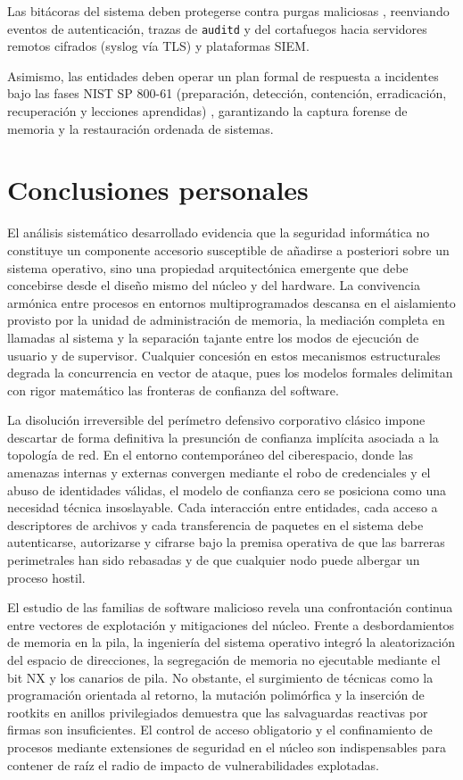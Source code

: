 \documentclass[12pt]{article}
\begin{document}
Las bitácoras del sistema deben protegerse contra purgas maliciosas \parencite[\S 15.1, p.\ 660]{stallings2018operating}, reenviando eventos de autenticación, trazas de \texttt{auditd} y del cortafuegos hacia servidores remotos cifrados (syslog vía TLS) y plataformas SIEM.

Asimismo, las entidades deben operar un plan formal de respuesta a incidentes bajo las fases NIST SP 800-61 (preparación, detección, contención, erradicación, recuperación y lecciones aprendidas) \parencite[\S 3, pp.\ 21--43]{nistSp800_61}, garantizando la captura forense de memoria y la restauración ordenada de sistemas.

\section{Conclusiones personales}\label{sec:conclusionesPersonales}

El análisis sistemático desarrollado evidencia que la seguridad informática no constituye un componente accesorio susceptible de añadirse a posteriori sobre un sistema operativo, sino una propiedad arquitectónica emergente que debe concebirse desde el diseño mismo del núcleo y del hardware. La convivencia armónica entre procesos en entornos multiprogramados descansa en el aislamiento provisto por la unidad de administración de memoria, la mediación completa en llamadas al sistema y la separación tajante entre los modos de ejecución de usuario y de supervisor. Cualquier concesión en estos mecanismos estructurales degrada la concurrencia en vector de ataque, pues los modelos formales delimitan con rigor matemático las fronteras de confianza del software.

La disolución irreversible del perímetro defensivo corporativo clásico impone descartar de forma definitiva la presunción de confianza implícita asociada a la topología de red. En el entorno contemporáneo del ciberespacio, donde las amenazas internas y externas convergen mediante el robo de credenciales y el abuso de identidades válidas, el modelo de confianza cero se posiciona como una necesidad técnica insoslayable. Cada interacción entre entidades, cada acceso a descriptores de archivos y cada transferencia de paquetes en el sistema debe autenticarse, autorizarse y cifrarse bajo la premisa operativa de que las barreras perimetrales han sido rebasadas y de que cualquier nodo puede albergar un proceso hostil.

El estudio de las familias de software malicioso revela una confrontación continua entre vectores de explotación y mitigaciones del núcleo. Frente a desbordamientos de memoria en la pila, la ingeniería del sistema operativo integró la aleatorización del espacio de direcciones, la segregación de memoria no ejecutable mediante el bit NX y los canarios de pila. No obstante, el surgimiento de técnicas como la programación orientada al retorno, la mutación polimórfica y la inserción de rootkits en anillos privilegiados demuestra que las salvaguardas reactivas por firmas son insuficientes. El control de acceso obligatorio y el confinamiento de procesos mediante extensiones de seguridad en el núcleo son indispensables para contener de raíz el radio de impacto de vulnerabilidades explotadas.
\end{document}
